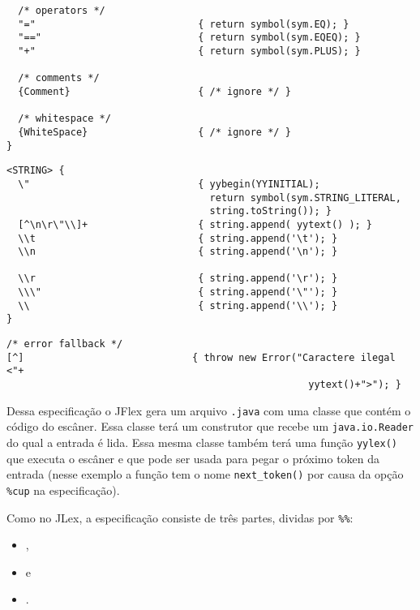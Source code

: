 \documentclass[11pt]{scrartcl}
\begin{document}
{\begin{verbatim}
  /* operators */
  "="                            { return symbol(sym.EQ); }
  "=="                           { return symbol(sym.EQEQ); }
  "+"                            { return symbol(sym.PLUS); }

  /* comments */
  {Comment}                      { /* ignore */ }
 
  /* whitespace */
  {WhiteSpace}                   { /* ignore */ }
}
\end{verbatim}
\label{CodeRulesYYtext}\begin{verbatim}
<STRING> {
  \"                             { yybegin(YYINITIAL); 
                                   return symbol(sym.STRING_LITERAL, 
                                   string.toString()); }
  [^\n\r\"\\]+                   { string.append( yytext() ); }
  \\t                            { string.append('\t'); }
  \\n                            { string.append('\n'); }

  \\r                            { string.append('\r'); }
  \\\"                           { string.append('\"'); }
  \\                             { string.append('\\'); }
}
\end{verbatim}
\label{CodeRulesAllStates}\begin{verbatim}
/* error fallback */
[^]                             { throw new Error("Caractere ilegal <"+
                                                    yytext()+">"); }
\end{verbatim}
}

Dessa especifica\c{c}\~ao o JFlex gera um arquivo \texttt{.java} com uma classe que cont\'em o
c\'odigo do esc\^aner. Essa classe ter\'a um construtor que recebe um \texttt{java.io.Reader}
do qual a entrada \'e lida. Essa mesma classe tamb\'em ter\'a uma fun\c{c}\~ao \texttt{yylex()}
que executa o esc\^aner e que pode ser usada para pegar o pr\'oximo token da entrada (nesse exemplo
a fun\c{c}\~ao tem o nome \texttt{next\_token()} por causa da op\c{c}\~ao \texttt{\%cup} na especifica\c{c}\~ao).

Como no JLex, a especifica\c{c}\~ao consiste de tr\^es partes, dividas por \texttt{\%\%}:
\begin{itemize}
\item {},
\item {} e
\item {}.
\end{itemize}
\end{document}
